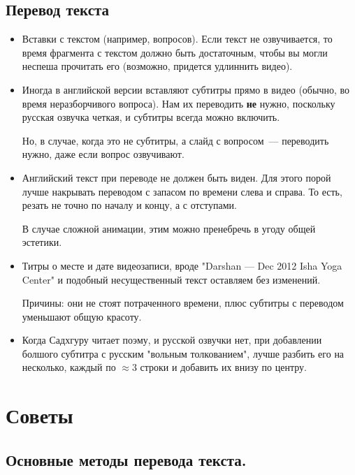 \documentclass[
a4paper, %
12pt, %
article,
onecolumn, %
openany, %
]{memoir}
\begin{document}
\subsection{Перевод текста}

\begin{itemize}

\item Вставки с текстом (например, вопросов). Если текст не озвучивается, то время фрагмента с текстом должно быть достаточным, чтобы вы могли неспеша прочитать его (возможно, придется удлиннить видео).

\item Иногда в английской версии вставляют субтитры прямо в видео
    {\color{gray}(обычно, во время неразборчивого вопроса)}. Нам их переводить
    \textbf{не} нужно, поскольку русская озвучка четкая, 
    и субтитры всегда можно включить.

    Но, в случае, когда это не субтитры, а слайд с вопросом~--- 
    переводить нужно, даже если вопрос озвучивают.
\item Английский текст при переводе не должен быть виден. Для этого порой лучше
    накрывать переводом с запасом по времени слева и справа. То есть, резать
    не точно по началу и концу, а с отступами.

    В случае сложной анимации, этим можно пренебречь в угоду общей эстетики.


\item Титры о месте и дате видеозаписи, вроде "Darshan — Dec 2012
    Isha Yoga Center" и подобный несущественный текст оставляем без изменений.

    {\color{gray} Причины: они не стоят потраченного времени, плюс 
     субтитры с переводом уменьшают  общую красоту.}

 \item Когда Садхгуру читает поэму, и русской озвучки нет, при добавлении 
     болшого субтитра с русским "вольным толкованием", лучше разбить его на 
     несколько, каждый
     по $\approx 3$ строки и добавить их внизу по центру. 

\end{itemize}


\newpage
\section{Советы}\label{advices}
\subsection{Основные методы перевода текста.}
\end{document}
